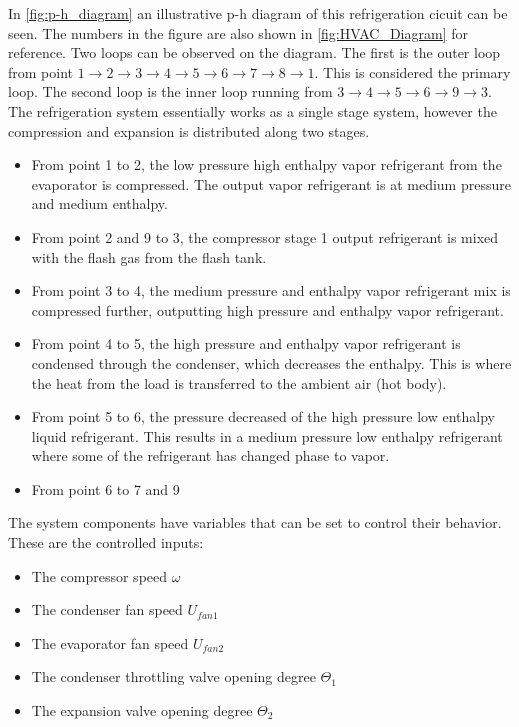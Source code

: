 In \cref{fig:p-h_diagram} an illustrative p-h diagram of this refrigeration cicuit can be seen. The numbers in the figure are also shown in \cref{fig:HVAC_Diagram} for reference. Two loops can be observed on the diagram. The first is the outer loop from point $1 \rightarrow 2\rightarrow 3 \rightarrow 4 \rightarrow 5 \rightarrow 6 \rightarrow 7 \rightarrow 8 \rightarrow 1$. This is considered the primary loop. The second loop is the inner loop running from $3 \rightarrow 4 \rightarrow 5 \rightarrow 6 \rightarrow 9 \rightarrow 3$. \\
The refrigeration system essentially works as a single stage system, however the compression and expansion is distributed along two stages.

\begin{itemize}
	\item From point 1 to 2, the low pressure high enthalpy vapor refrigerant from the evaporator is compressed. The output vapor refrigerant is at medium pressure and medium enthalpy. 
	\item From point 2 and 9 to 3, the compressor stage 1 output refrigerant is mixed with the flash gas from the flash tank. 
	\item From point 3 to 4, the medium pressure and enthalpy vapor refrigerant mix is compressed further, outputting high pressure and enthalpy vapor refrigerant.
	\item From point 4 to 5, the high pressure and enthalpy vapor refrigerant is condensed through the condenser, which decreases the enthalpy. This is where the heat from the load is transferred to the ambient air (hot body).
	\item From point 5 to 6, the pressure decreased of the high pressure low enthalpy liquid refrigerant. This results in a medium pressure low enthalpy refrigerant where some of the refrigerant has changed phase to vapor.
	\item From point 6 to 7 and 9 
\end{itemize}

The system components have variables that can be set to control their behavior. These are the controlled inputs:

\begin{itemize}
	\item The compressor speed $ \omega $
	\item The condenser fan speed $ U_{fan1} $
	\item The evaporator fan speed  $ U_{fan2} $
	\item The condenser throttling valve opening degree $ \Theta_1 $
	\item The expansion valve opening degree $ \Theta_2 $
\end{itemize}

